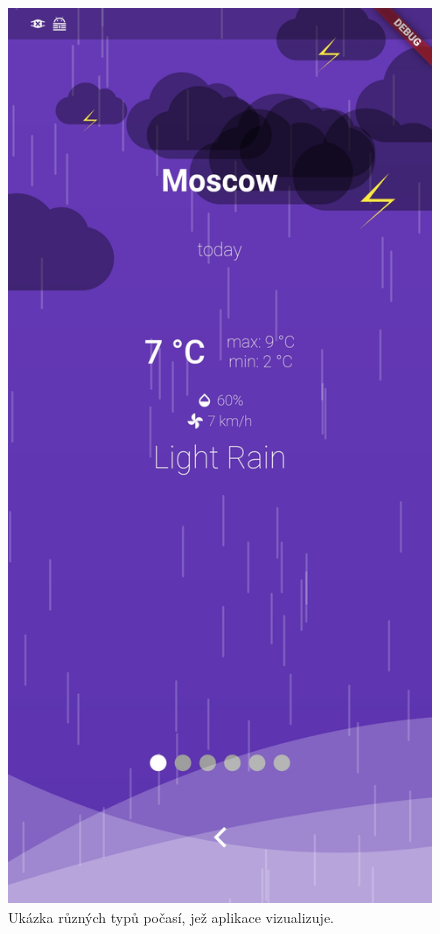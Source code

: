 \documentclass[12pt, a4paper]{article}
\begin{document}
\begin{figure}[!htb]
  \includegraphics[width=\linewidth]{img/app-thunder.jpg}
\endminipage

  \caption{Ukázka různých typů počasí, jež aplikace vizualizuje.}
\end{figure}
\end{document}
